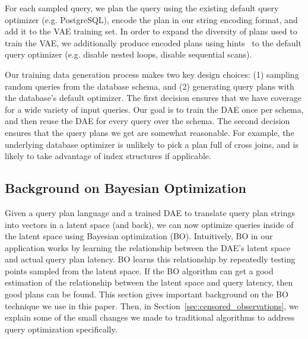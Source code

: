 For each sampled query, we plan the query using the existing default query optimizer (e.g. PostgreSQL), encode the plan in our string encoding format, and add it to the VAE training set. In order to expand the diversity of plans used to train the VAE, we additionally produce encoded plans using hints~\cite{url-pg_hints} to the default query optimizer (e.g. disable nested loops, disable sequential scans).

Our training data generation process makes two key design choices: (1) sampling random queries from the database schema, and (2) generating query plans with the database's default optimizer. The first decision ensures that we have coverage for a wide variety of input queries. Our goal is to train the DAE once per schema, and then reuse the DAE for every query over the schema. The second decision ensures that the query plans we get are somewhat reasonable. For example, the underlying database optimizer is unlikely to pick a plan full of cross joins, and is likely to take advantage of index structures if applicable.


\subsection{Background on Bayesian Optimization} \label{sec:bo-background}
Given a query plan language and a trained DAE to translate query plan strings into vectors in a latent space (and back), we can now optimize queries inside of the latent space using Bayesian optimization (BO). Intuitively, BO in our application works by learning the relationship between the DAE's latent space and actual query plan latency. BO learns this relationship by repeatedly testing points sampled from the latent space. If the BO algorithm can get a good estimation of the relationship between the latent space and query latency, then good plans can be found. This section gives important background on the BO technique we use in this paper. Then, in Section~\ref{sec:censored_observations}, we explain some of the small changes we made to traditional algorithms to address query optimization specifically.


